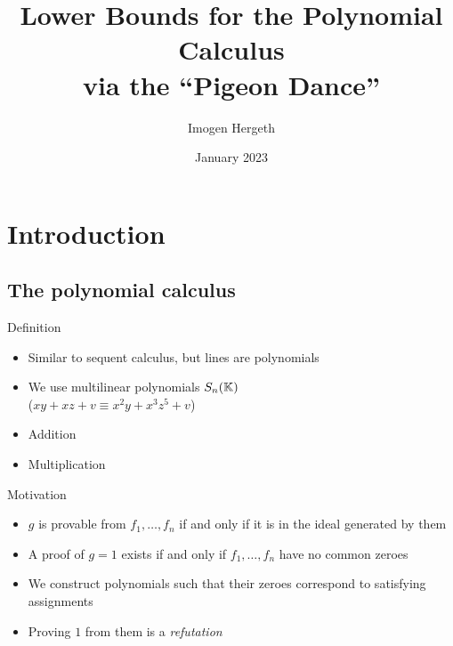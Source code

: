\documentclass[xcolor={dvipsnames}, aspectratio=169, handout]{beamer}
\title{Lower Bounds for the Polynomial Calculus\\via the ``Pigeon Dance''}
\author{Imogen Hergeth}
\date{January 2023}
\newcommand{\Sn}{S_n(\KK)}
\begin{document}
\maketitle

\section{Introduction}

\subsection{The polynomial calculus}
\begin{frame}{Definition}
    \begin{itemize}[<+->]
        \item Similar to sequent calculus, but lines are polynomials
        \item We use multilinear polynomials $\Sn$\\
            ($xy + xz + v \equiv x^2y + x^3z^5 + v$)
        \item Addition
        \begin{prooftree}
        \end{prooftree}
        \item Multiplication
        \begin{prooftree}
        \end{prooftree}
    \end{itemize}
\end{frame}

\begin{frame}{Motivation}
    \begin{itemize}[<+->]
        \item $g$ is provable from $f_1, \ldots, f_n$ if and only if it is in the ideal generated by them
        \item A proof of $g=1$ exists if and only if $f_1, \ldots, f_n$ have no common zeroes
        \item We construct polynomials such that their zeroes correspond to satisfying assignments
        \item Proving $1$ from them is a \textit{refutation}
    \end{itemize}
\end{frame}
\end{document}
